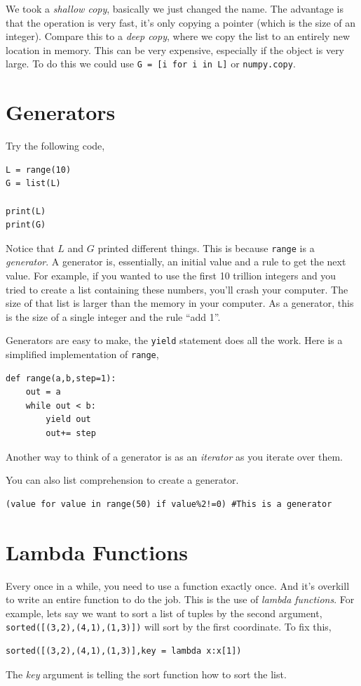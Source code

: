 \documentclass[11pt,letterpaper]{article}
\begin{document}
We took a \emph{shallow copy}, basically we just changed the name. The advantage is that the operation
is very fast, it's only copying a pointer (which is the size of an integer). Compare this to a 
\emph{deep copy}, where we copy the list to an entirely new location in memory. This can be very
expensive, especially if the object is very large. To do this we could use \texttt{G = [i for i in L]}
or \texttt{numpy.copy}.


\section{Generators}
Try the following code,
\begin{verbatim}
L = range(10)
G = list(L)

print(L)
print(G)
\end{verbatim}
Notice that $L$ and $G$ printed different things. This is because \texttt{range} is a \emph{generator}.
A generator is, essentially, an initial value and a rule to get the next value. For example, if
you wanted to use the first 10 trillion integers and you tried to create a list containing these
numbers, you'll crash your computer. The size of that list is larger than the memory in your
computer. As a generator, this is the size of a single integer and the rule ``add 1''. 

Generators are easy to make, the \texttt{yield} statement does all the work. Here is a simplified 
implementation of \texttt{range},
\begin{verbatim}
def range(a,b,step=1):
    out = a
    while out < b:
        yield out
        out+= step
\end{verbatim}
Another way to think of a generator is as an \emph{iterator} as you iterate over them.

You can also list comprehension to create a generator. 
\begin{verbatim}
(value for value in range(50) if value%2!=0) #This is a generator
\end{verbatim}





\section{Lambda Functions}
Every once in a while, you need to use a function exactly once. And it's overkill to write an entire
function to do the job. This is the use of \emph{lambda functions}. For example, lets say we 
want to sort a list of tuples by the second argument, \texttt{sorted([(3,2),(4,1),(1,3)])} will
sort by the first coordinate. To fix this,
\begin{verbatim}
sorted([(3,2),(4,1),(1,3)],key = lambda x:x[1])
\end{verbatim}
The \emph{key} argument is telling the sort function how to sort the list. 
\end{document}
